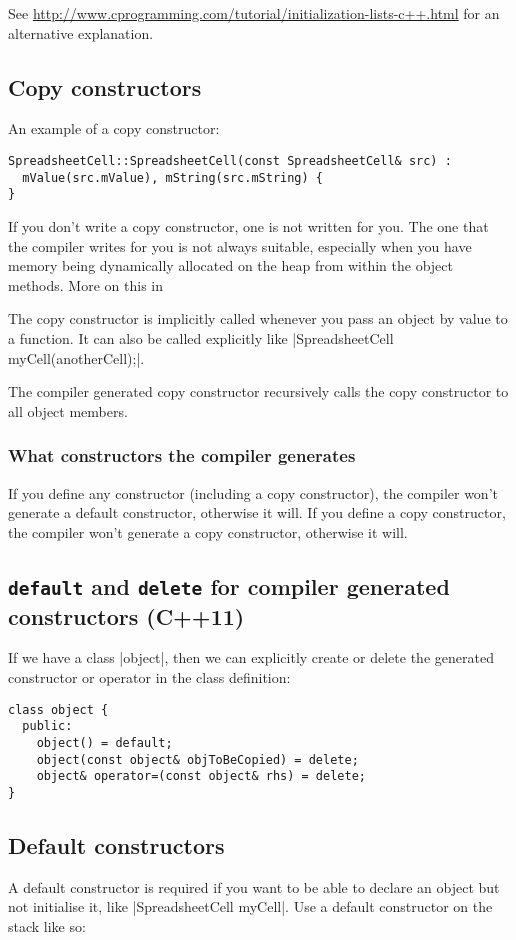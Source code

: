 \documentclass[a4paper,12pt,oneside]{book}
\begin{document}
{See {\footnotesize\url{http://www.cprogramming.com/tutorial/initialization-lists-c++.html}} for an alternative explanation.

\subsection{Copy constructors}
An example of a copy constructor:
\begin{lstlisting}
SpreadsheetCell::SpreadsheetCell(const SpreadsheetCell& src) :
  mValue(src.mValue), mString(src.mString) {
}
\end{lstlisting}
If you don't write a copy constructor, one is not written for you. The one that the compiler writes for you is not always suitable, especially when you have memory being dynamically allocated on the heap from within the object methods. More on this in %

The copy constructor is implicitly called whenever you pass an object by value to a function. It can also be called explicitly like \lst|SpreadsheetCell myCell(anotherCell);|.

The compiler generated copy constructor recursively calls the copy constructor to all object members.
\subsubsection{What constructors the compiler generates}
If you define any constructor (including a copy constructor), the compiler won't generate a default constructor, otherwise it will. If you define a copy constructor, the compiler won't generate a copy constructor, otherwise it will.
\subsection{\texttt{default} and \texttt{delete} for compiler generated constructors (C++11)}
If we have a class \lst|object|, then we can explicitly create or delete the generated constructor or operator in the class definition:

\begin{lstlisting}
class object {
  public:
    object() = default;
    object(const object& objToBeCopied) = delete;
    object& operator=(const object& rhs) = delete;
}
\end{lstlisting}

\subsection{Default constructors}
A default constructor is required if you want to be able to declare an object but not initialise it, like \lst|SpreadsheetCell myCell|. Use a default constructor on the stack like so:

}
\end{document}
